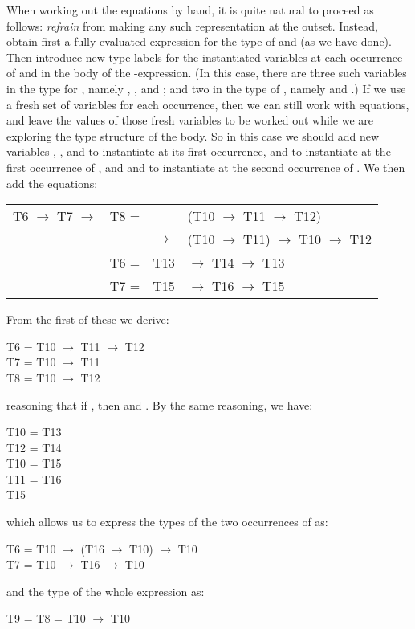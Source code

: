 When working out the equations by hand, it is quite natural to proceed as
follows: \textit{refrain} from making any such representation at the outset. Instead,
obtain first a fully evaluated expression for the type of  and  (as we have
done). Then introduce new type labels for the instantiated variables at
each occurrence of  and  in the body of the -expression. (In this case,
there are three such variables in the type for , namely , , and ; and two
in the type of , namely  and .) If we use a fresh set of variables for each
occurrence, then we can still work with equations, and leave the values of
those fresh variables to be worked out while we are exploring the type
structure of the body. So in this case we should add new variables , ,
and  to instantiate  at its first occurrence,  and  to instantiate  at the
first occurrence of , and  and  to instantiate  at the second
occurrence of . We then add the equations:
\begin{mlcoded}
    \begin{tabular}{llll}
        T6 $\rightarrow$ T7 $\rightarrow$ &T8 = & &(T10 $\rightarrow$ T11 $\rightarrow$ T12) \\
        & & $\rightarrow$ &(T10 $\rightarrow$ T11) $\rightarrow$ T10 $\rightarrow$ T12 \\
        & T6 = & T13 & $\rightarrow$ T14 $\rightarrow$ T13 \\
        & T7 = & T15 & $\rightarrow$ T16 $\rightarrow$ T15
    \end{tabular}
\end{mlcoded}

From the first of these we derive:
\begin{mlcoded}
    T6 = T10 $\rightarrow$ T11 $\rightarrow$ T12 \\
    T7 = T10 $\rightarrow$ T11 \\
    T8 = T10 $\rightarrow$ T12
\end{mlcoded}
reasoning that if , then  and .
By the same reasoning, we have:
\begin{mlcoded}
    T10 = T13 \\
    T12 = T14 \\
    T10 = T15 \\
    T11 = T16 \\
    T15
\end{mlcoded}
which allows us to express the types of the two occurrences of  as:
\begin{mlcoded}
    T6 = T10 $\rightarrow$ (T16 $\rightarrow$ T10) $\rightarrow$ T10 \\
    T7 = T10 $\rightarrow$ T16 $\rightarrow$ T10
\end{mlcoded}
and the type of the whole expression as:
\begin{mlcoded}
    T9 = T8 = T10 $\rightarrow$ T10
\end{mlcoded}

